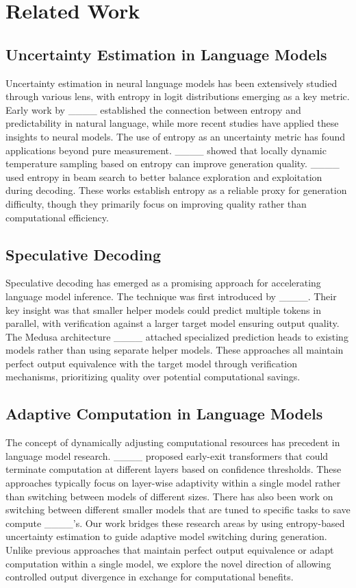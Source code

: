 \section{Related Work}
\subsection{Uncertainty Estimation in Language Models}
Uncertainty estimation in neural language models has been extensively studied through various lens, with entropy in logit distributions emerging as a key metric. Early work by ____ established the connection between entropy and predictability in natural language, while more recent studies have applied these insights to neural models. The use of entropy as an uncertainty metric has found applications beyond pure measurement. ____ showed that locally dynamic temperature sampling based on entropy can improve generation quality. ____ used entropy in beam search to better balance exploration and exploitation during decoding. These works establish entropy as a reliable proxy for generation difficulty, though they primarily focus on improving quality rather than computational efficiency.
\subsection{Speculative Decoding}
Speculative decoding has emerged as a promising approach for accelerating language model inference. The technique was first introduced by ____. Their key insight was that smaller helper models could predict multiple tokens in parallel, with verification against a larger target model ensuring output quality. The Medusa architecture ____ attached specialized prediction heads to existing models rather than using separate helper models. These approaches all maintain perfect output equivalence with the target model through verification mechanisms, prioritizing quality over potential computational savings.
\subsection{Adaptive Computation in Language Models}
The concept of dynamically adjusting computational resources has precedent in language model research. ____ proposed early-exit transformers that could terminate computation at different layers based on confidence thresholds. These approaches typically focus on layer-wise adaptivity within a single model rather than switching between models of different sizes. There has also been work on switching between different smaller models that are tuned to specific tasks to save compute ____'s. Our work bridges these research areas by using entropy-based uncertainty estimation to guide adaptive model switching during generation. Unlike previous approaches that maintain perfect output equivalence or adapt computation within a single model, we explore the novel direction of allowing controlled output divergence in exchange for computational benefits.